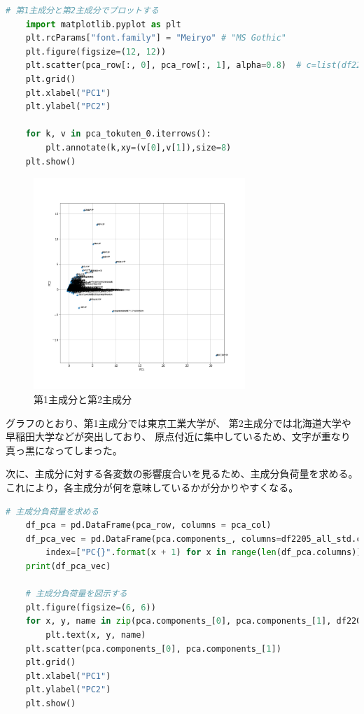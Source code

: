 \documentclass[submit,noauthor]{ono}
\begin{document}
\begin{lstlisting}[language=Python,breaklines]
	# 第1主成分と第2主成分でプロットする
	import matplotlib.pyplot as plt
	plt.rcParams["font.family"] = "Meiryo" # "MS Gothic"
	plt.figure(figsize=(12, 12))
	plt.scatter(pca_row[:, 0], pca_row[:, 1], alpha=0.8)  # c=list(df2205_all_std.iloc[:, 0]))
	plt.grid()
	plt.xlabel("PC1")
	plt.ylabel("PC2")
	
	for k, v in pca_tokuten_0.iterrows():
		plt.annotate(k,xy=(v[0],v[1]),size=8)
	plt.show()
	\end{lstlisting}

\begin{figure}[h]
	\includegraphics[width=8cm]{./picture/pc1pc2.png}
	\caption{第1主成分と第2主成分}
	\label{fig:pc1pc2}
\end{figure}

グラフのとおり、第1主成分では東京工業大学が、
第2主成分では北海道大学や早稲田大学などが突出しており、
原点付近に集中しているため、文字が重なり真っ黒になってしまった。

次に、主成分に対する各変数の影響度合いを見るため、主成分負荷量を求める。
これにより，各主成分が何を意味しているかが分かりやすくなる。


\begin{lstlisting}[language=Python,breaklines]
	# 主成分負荷量を求める
	df_pca = pd.DataFrame(pca_row, columns = pca_col)
	df_pca_vec = pd.DataFrame(pca.components_, columns=df2205_all_std.columns,
		index=["PC{}".format(x + 1) for x in range(len(df_pca.columns))])
	print(df_pca_vec)
	
	# 主成分負荷量を図示する
	plt.figure(figsize=(6, 6))
	for x, y, name in zip(pca.components_[0], pca.components_[1], df2205_all_std.columns[0:]):
		plt.text(x, y, name)
	plt.scatter(pca.components_[0], pca.components_[1])
	plt.grid()
	plt.xlabel("PC1")
	plt.ylabel("PC2")
	plt.show()
\end{lstlisting}
\end{document}
